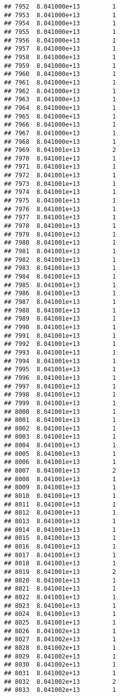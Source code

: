 \documentclass[
]{article}
\begin{document}
\begin{verbatim}
## 7952  8.041000e+13         1
## 7953  8.041000e+13         1
## 7954  8.041000e+13         1
## 7955  8.041000e+13         1
## 7956  8.041000e+13         1
## 7957  8.041000e+13         1
## 7958  8.041000e+13         1
## 7959  8.041000e+13         1
## 7960  8.041000e+13         1
## 7961  8.041000e+13         1
## 7962  8.041000e+13         1
## 7963  8.041000e+13         1
## 7964  8.041000e+13         1
## 7965  8.041000e+13         1
## 7966  8.041000e+13         1
## 7967  8.041000e+13         1
## 7968  8.041000e+13         1
## 7969  8.041001e+13         2
## 7970  8.041001e+13         1
## 7971  8.041001e+13         1
## 7972  8.041001e+13         1
## 7973  8.041001e+13         1
## 7974  8.041001e+13         1
## 7975  8.041001e+13         1
## 7976  8.041001e+13         1
## 7977  8.041001e+13         1
## 7978  8.041001e+13         1
## 7979  8.041001e+13         1
## 7980  8.041001e+13         1
## 7981  8.041001e+13         1
## 7982  8.041001e+13         1
## 7983  8.041001e+13         1
## 7984  8.041001e+13         1
## 7985  8.041001e+13         1
## 7986  8.041001e+13         1
## 7987  8.041001e+13         1
## 7988  8.041001e+13         1
## 7989  8.041001e+13         1
## 7990  8.041001e+13         1
## 7991  8.041001e+13         1
## 7992  8.041001e+13         1
## 7993  8.041001e+13         1
## 7994  8.041001e+13         1
## 7995  8.041001e+13         1
## 7996  8.041001e+13         1
## 7997  8.041001e+13         1
## 7998  8.041001e+13         1
## 7999  8.041001e+13         1
## 8000  8.041001e+13         1
## 8001  8.041001e+13         1
## 8002  8.041001e+13         1
## 8003  8.041001e+13         1
## 8004  8.041001e+13         1
## 8005  8.041001e+13         1
## 8006  8.041001e+13         1
## 8007  8.041001e+13         2
## 8008  8.041001e+13         1
## 8009  8.041001e+13         1
## 8010  8.041001e+13         1
## 8011  8.041001e+13         1
## 8012  8.041001e+13         1
## 8013  8.041001e+13         1
## 8014  8.041001e+13         1
## 8015  8.041001e+13         1
## 8016  8.041001e+13         1
## 8017  8.041001e+13         1
## 8018  8.041001e+13         1
## 8019  8.041001e+13         2
## 8020  8.041001e+13         1
## 8021  8.041001e+13         1
## 8022  8.041001e+13         1
## 8023  8.041001e+13         1
## 8024  8.041001e+13         1
## 8025  8.041001e+13         1
## 8026  8.041002e+13         1
## 8027  8.041002e+13         1
## 8028  8.041002e+13         1
## 8029  8.041002e+13         1
## 8030  8.041002e+13         1
## 8031  8.041002e+13         1
## 8032  8.041002e+13         2
## 8033  8.041002e+13         1

\end{verbatim}
\end{document}
